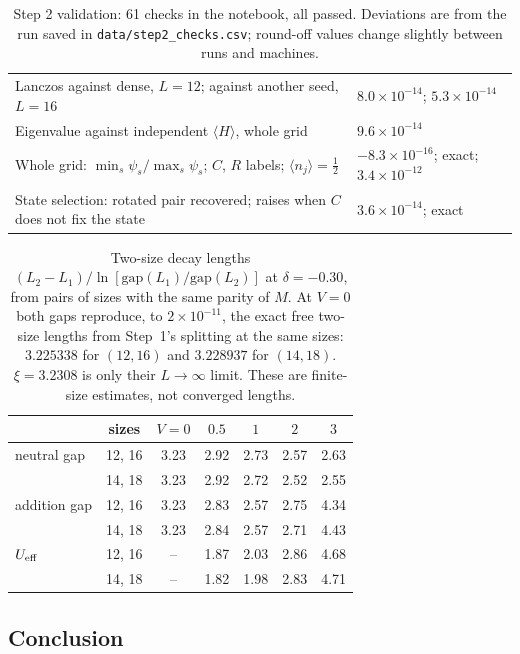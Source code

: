 \documentclass[11pt,a4paper]{article}
\begin{document}
\begin{table}[t]
\begin{tabular}{p{10.2cm}l}
    Lanczos against dense, $L=12$; against another seed, $L=16$ & $8.0\times10^{-14}$; $5.3\times10^{-14}$ \\
    Eigenvalue against independent $\langle H\rangle$, whole grid & $9.6\times10^{-14}$ \\
    Whole grid: $\min_s\psi_s/\max_s\psi_s$; $C$, $R$ labels; $\langle n_j\rangle=\tfrac12$ & $-8.3\times10^{-16}$; exact; $3.4\times10^{-12}$ \\
    State selection: rotated pair recovered; raises when $C$ does not fix the state & $3.6\times10^{-14}$; exact \\
    \bottomrule
  \end{tabular}
  \caption{Step 2 validation: 61 checks in the notebook, all passed.
  Deviations are from the run saved in \texttt{data/step2\_checks.csv}; round-off values change slightly between runs and machines.}
  \label{tab:checks2}
\end{table}

\begin{table}[t]
  \centering
  \footnotesize
  \begin{tabular}{lcccccc}
    \toprule
    & sizes & $V=0$ & $0.5$ & $1$ & $2$ & $3$ \\
    \midrule
    neutral gap & 12, 16 & 3.23 & 2.92 & 2.73 & 2.57 & 2.63 \\
    & 14, 18 & 3.23 & 2.92 & 2.72 & 2.52 & 2.55 \\
    addition gap & 12, 16 & 3.23 & 2.83 & 2.57 & 2.75 & 4.34 \\
    & 14, 18 & 3.23 & 2.84 & 2.57 & 2.71 & 4.43 \\
    $U_{\rm eff}$ & 12, 16 & -- & 1.87 & 2.03 & 2.86 & 4.68 \\
    & 14, 18 & -- & 1.82 & 1.98 & 2.83 & 4.71 \\
    \bottomrule
  \end{tabular}
  \caption{Two-size decay lengths $(L_2-L_1)/\ln[\mathrm{gap}(L_1)/\mathrm{gap}(L_2)]$ at $\delta=-0.30$, from pairs of sizes with the same parity of $M$.
  At $V=0$ both gaps reproduce, to $2\times10^{-11}$, the exact free two-size lengths from Step~1's splitting at the same sizes: $3.225338$ for $(12,16)$ and $3.228937$ for $(14,18)$.
  $\xi=3.2308$ is only their $L\to\infty$ limit.
  These are finite-size estimates, not converged lengths.}
  \label{tab:lengths}
\end{table}

\subsection{Conclusion}
\end{document}
